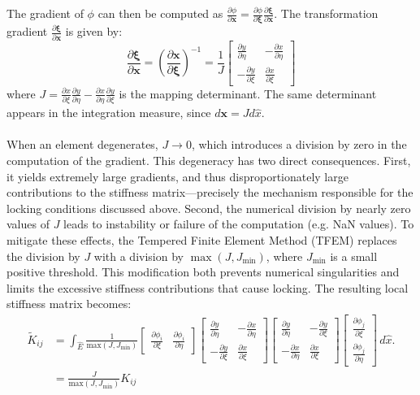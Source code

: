 \documentclass{article}
\newcommand{\dpartial}[2]{\frac{\partial{#1}}{\partial{#2}}}
\newcommand{\J}{J}
\newcommand{\Jmin}{J_{\text{min}}}
\begin{document}
\iffalse
The gradient of $\phi$ can then be computed as $\frac{\partial \phi}{\partial \bm{x}} = \frac{\partial \phi}{\partial \bm{\xi}} \frac{\partial \bm{\xi}}{\partial \bm{x}}$.
The transformation gradient $\dpartial {\bm{\xi}}{\bm{x}} $ is given by:
\[
  \dpartial{\bm{\xi}}{\bm{x}} = \left( \dpartial{\bm{x}}{\bm{\xi}} \right)^{-1} = \frac{1}{\J} \begin{bmatrix}
    \dpartial{y}{\eta} & -\dpartial{x}{\eta} \\
    - \dpartial{y}{\xi} & \dpartial{x}{\xi} 
  \end{bmatrix}
\]
where $\J = \dpartial{x}{\xi}\dpartial{y}{\eta}-\dpartial{x}{\eta}\dpartial{y}{\xi}$ is the mapping determinant. The same determinant appears in the integration measure, since $d\bm{x} = \J d\hat{x}$. \\ \\
When an element degenerates, $\J \to 0$, which introduces a division by zero in the computation of the gradient. This degeneracy has two direct consequences. First, it yields extremely large gradients, and thus disproportionately large contributions to the stiffness matrix—precisely the mechanism responsible for the locking conditions discussed above.
Second, the numerical division by nearly zero values of $\J$ leads to instability or failure of the computation (e.g. NaN values). To mitigate these effects, the Tempered Finite Element Method (TFEM) replaces the division by $\J$ with a division by $\max(\J, \Jmin)$, where $\Jmin$ is a small positive threshold. This modification both prevents numerical singularities and limits the excessive stiffness contributions that cause locking. The resulting local stiffness matrix becomes:
\begin{align*}
  \tilde K_{ij}
  &= 
  \int_{\hat{E}}
\frac{1}{\text{max}(\J, \Jmin)}
  \begin{bmatrix}
    \dpartial {\phi_i}{\xi} & \dpartial{\phi_i}{\eta}
  \end{bmatrix} 
  \begin{bmatrix} 
    \dpartial y\eta & -\dpartial x\eta\\
    -\dpartial y\xi & \dpartial x\xi
  \end{bmatrix} 
  \begin{bmatrix} 
    \dpartial y\eta & -\dpartial y\xi\\
    -\dpartial x\eta & \dpartial x\xi
  \end{bmatrix} 
    \begin{bmatrix}
      \dpartial {\phi_j} \xi \\ \dpartial {\phi_j} \eta
    \end{bmatrix}
  \, d \hat{x}. \\
  &= 
\frac{\J}{\text{max}(\J, \Jmin)} K_{ij}
\end{align*}
\end{document}
